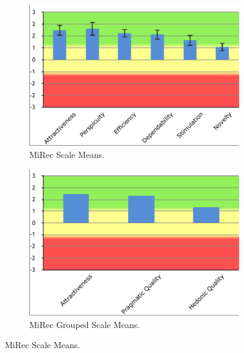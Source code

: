 \begin{figure}
\centering
\begin{subfigure}[b]{0.5\textwidth}
\includegraphics[width=\textwidth]{figures/mirec-results}
\caption{MiRec Scale Means.}
\label{fig:figure54b}
\end{subfigure}
\begin{subfigure}[b]{0.5\textwidth}
\includegraphics[width=\textwidth]{figures/mirec-results2}
\caption{MiRec Grouped Scale Means.}
\label{fig:figure54a}
\end{subfigure}
\caption{MiRec Scale Means.}
\label{fig:figure54}
\end{figure}

